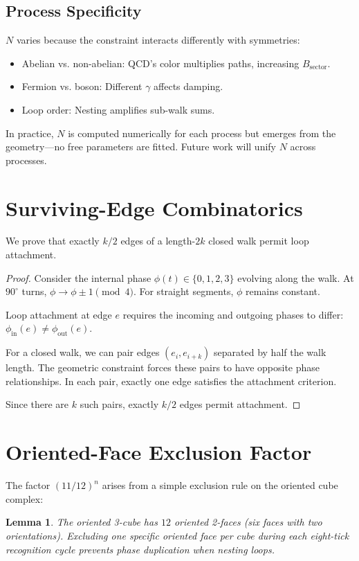 \documentclass[11pt,a4paper]{article}
\newtheorem{lemma}[theorem]{Lemma}
\theoremstyle{definition}
\theoremstyle{remark}
\begin{document}
\subsection{Process Specificity}
$N$ varies because the constraint interacts differently with symmetries:
\begin{itemize}
\item Abelian vs. non-abelian: QCD's color multiplies paths, increasing $B_\text{sector}$.
\item Fermion vs. boson: Different $\gamma$ affects damping.
\item Loop order: Nesting amplifies sub-walk sums.
\end{itemize}
In practice, $N$ is computed numerically for each process but emerges from the geometry—no free parameters are fitted. Future work will unify $N$ across processes.

\section{Surviving-Edge Combinatorics}
\label{app:edges}

We prove that exactly $k/2$ edges of a length-$2k$ closed walk permit loop attachment.

\begin{proof}
Consider the internal phase $\phi(t) \in \{0,1,2,3\}$ evolving along the walk. At $90^\circ$ turns, $\phi \to \phi \pm 1 \pmod{4}$. For straight segments, $\phi$ remains constant.

Loop attachment at edge $e$ requires the incoming and outgoing phases to differ: $\phi_{\text{in}}(e) \neq \phi_{\text{out}}(e)$. 

For a closed walk, we can pair edges $(e_i, e_{i+k})$ separated by half the walk length. The geometric constraint forces these pairs to have opposite phase relationships. In each pair, exactly one edge satisfies the attachment criterion.

Since there are $k$ such pairs, exactly $k/2$ edges permit attachment.
\end{proof}

\section{Oriented-Face Exclusion Factor}
\label{app:halfvoxel}

The factor $(11/12)^n$ arises from a simple exclusion rule on the oriented cube complex:

\begin{lemma}
The oriented 3-cube has $12$ oriented 2-faces (six faces with two orientations). Excluding one specific oriented face per cube during each eight-tick recognition cycle prevents phase duplication when nesting loops.
\end{lemma}
\end{document}
